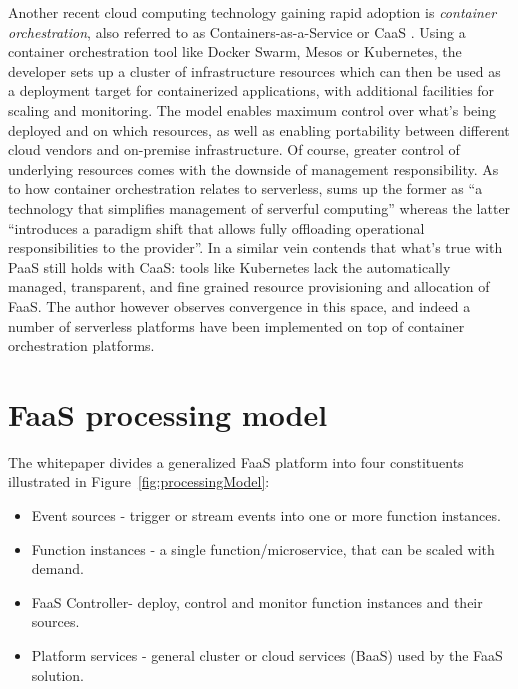 Another recent cloud computing technology gaining rapid adoption is \textit{container orchestration}, also referred to as Containers-as-a-Service or CaaS \parencite{cncf18serverlessWG}. Using a container orchestration tool like Docker Swarm, Mesos or Kubernetes, the developer sets up a cluster of infrastructure resources which can then be used as a deployment target for containerized applications, with additional facilities for scaling and monitoring. The model enables maximum control over what's being deployed and on which resources, as well as enabling portability between different cloud vendors and on-premise infrastructure. Of course, greater control of underlying resources comes with the downside of management responsibility. As to how container orchestration relates to serverless, \textcite{jonas19berkeleyView} sums up the former as ``a technology that simplifies management of serverful computing'' whereas the latter ``introduces a paradigm shift that allows fully offloading operational responsibilities to the provider''. In a similar vein \textcite{robert2016serverlessarchitectures} contends that what's true with PaaS still holds with CaaS: tools like Kubernetes lack the automatically managed, transparent, and fine grained resource provisioning and allocation of FaaS. The author however observes convergence in this space, and indeed a number of serverless platforms have been implemented on top of container orchestration platforms.

\section{FaaS processing model} \label{sec:processingModel}

The \textcite{cncf18serverlessWG} whitepaper divides a generalized FaaS platform into four constituents illustrated in Figure~\ref{fig:processingModel}:

\begin{itemize}
  \item Event sources - trigger or stream events into one or more function instances.
  \item Function instances - a single function/microservice, that can be scaled with demand.
  \item FaaS Controller- deploy, control and monitor function instances and their sources.
  \item Platform services - general cluster or cloud services (BaaS) used by the FaaS solution.
\end{itemize}

